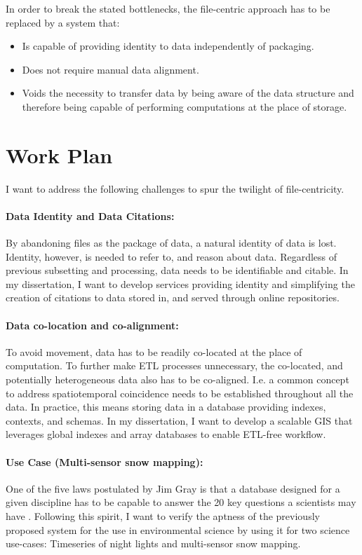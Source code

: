 \documentclass[letterpaper, parskip=half]{scrartcl}
\begin{document}
In order to break the stated bottlenecks, the file-centric approach has to be replaced by a system that:
\begin{itemize}
    \item Is capable of providing identity to data independently of packaging.
    \item Does not require manual data alignment.
    \item Voids the necessity to transfer data by being aware of the data structure and therefore being capable of performing computations at the place of storage.
\end{itemize}


\newpage

\section{Work Plan}
I want to address the following challenges to spur the twilight of file-centricity.

\paragraph{Data Identity and Data Citations:}
By abandoning files as the package of data, a natural identity of data is lost. Identity, however, is needed to refer to, and reason about data. Regardless of previous subsetting and processing, data needs to be identifiable and citable. In my dissertation, I want to develop services providing identity and simplifying the creation of citations to data stored in, and served through online repositories.

\paragraph{Data co-location and co-alignment:}
To avoid movement, data has to be readily co-located at the place of computation. To further make \gls{ETL} processes unnecessary, the co-located, and potentially heterogeneous data also has to be co-aligned. I.e. a common concept to address spatiotemporal coincidence needs to be established throughout all the data. In practice, this means storing data in a database providing indexes, contexts, and schemas. 
In my dissertation, I want to develop a scalable \gls{GIS} that leverages global indexes and array databases to enable \gls{ETL}-free workflow.

\paragraph{Use Case (Multi-sensor snow mapping):}
One of the five laws postulated by Jim Gray is that a database designed for a given discipline has to be capable to answer the 20 key questions a scientists may have \citep{Hey2009, Szalay2009}.
Following this spirit, I want to verify the aptness of the previously proposed system for the use in environmental science by using it for two science use-cases: Timeseries of night lights and multi-sensor snow mapping. 
\end{document}
